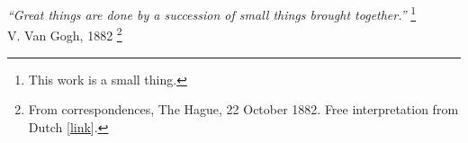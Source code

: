 \newpage

\vspace*{5cm}
\begin{flushright}
\textit{“Great things are done by a succession of small things brought together.”} \footnote{This work is a small thing.} \\
V. Van Gogh, 1882 \footnote{From correspondences, The Hague, 22 October 1882. Free interpretation from Dutch [\href{https://vangoghletters.org/vg/letters/let274/letter.html}{link}].}
\end{flushright}


\thispagestyle{empty}

\cleardoublepage{}
\thispagestyle{empty}